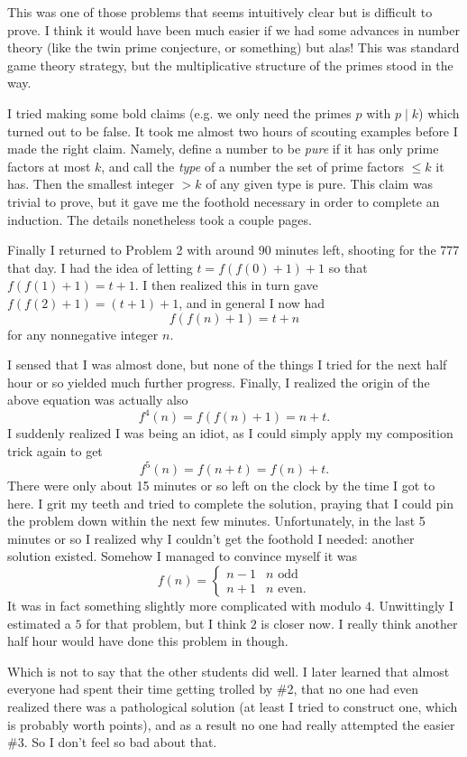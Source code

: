 \documentclass[11pt]{scrreprt}
\begin{document}
This was one of those problems that seems intuitively clear but is difficult to prove. I think it would have been much easier if we had some advances in number theory (like the twin prime conjecture, or something) but alas! This was standard game theory strategy, but the multiplicative structure of the primes stood in the way.

I tried making some bold claims (e.g. we only need the primes $p$ with $p \mid k$) which turned out to be false. It took me almost two hours of scouting examples before I made the right claim. Namely, define a number to be \emph{pure} if it has only prime factors at most $k$, and call the \emph{type} of a number the set of prime factors $\le k$ it has. Then the smallest integer $> k$ of any given type is pure. This claim was trivial to prove, but it gave me the foothold necessary in order to complete an induction. The details nonetheless took a couple pages.

Finally I returned to Problem 2 with around 90 minutes left, shooting for the $777$ that day. I had the idea of letting $t = f(f(0)+1)+1$ so that
$f(f(1)+1) = t+1$. I then realized this in turn gave $f(f(2)+1) = (t+1)+1$, and in general I now had
\[ f\left( f(n)+1 \right) = t+n \]
for any nonnegative integer $n$.

I sensed that I was almost done, but none of the things I tried for the next half hour or so yielded much further progress. Finally, I realized the origin of the above equation was actually also
\[ f^4(n) = f(f(n)+1) = n+t. \]
I suddenly realized I was being an idiot, as I could simply apply my composition trick again to get
\[ f^5(n) = f(n+t) = f(n) + t. \]
There were only about 15 minutes or so left on the clock by the time I got to here. I grit my teeth and tried to complete the solution, praying that I could pin the problem down within the next few minutes.
Unfortunately, in the last 5 minutes or so I realized why I couldn't get the foothold I needed: another solution existed.
Somehow I managed to convince myself it was
\[ f(n) =
  \begin{cases}
    n-1 & \text{$n$ odd} \\
    n+1 & \text{$n$ even}.
  \end{cases} \]
It was in fact something slightly more complicated with modulo $4$. Unwittingly I estimated a $5$ for that problem, but I think $2$ is closer now. I really think another half hour would have done this problem in though.

Which is not to say that the other students did well. I later learned that almost everyone had spent their time getting trolled by \#2, that no one had even realized there was a pathological solution (at least I tried to construct one, which is probably worth points), and as a result no one had really attempted the easier \#3. So I don't feel so bad about that.
\end{document}
